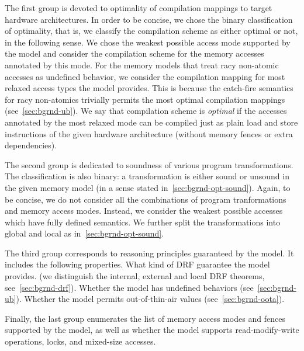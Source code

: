 The first group is devoted to optimality of compilation mappings
to target hardware architectures. In order to be concise, 
we chose the binary classification of optimality, 
that is, we classify the compilation scheme as either optimal or not,
in the following sense.
We chose the weakest possible access mode supported by the model
and consider the compilation scheme for the memory accesses annotated by this mode. 
For the memory models that treat racy non-atomic accesses
as undefined behavior, we consider the compilation mapping
for most relaxed access types the model provides.
This is because the catch-fire semantics for racy non-atomics 
trivially permits the most optimal compilation mappings (see~\cref{sec:bgrnd-ub}).
We say that compilation scheme is \emph{optimal} if the 
accesses annotated by the most relaxed mode 
can be compiled just as plain load and store instructions 
of the given hardware architecture (\ie without memory fences or extra dependencies). 

The second group is dedicated to soundness of various program transformations. 
The classification is also binary: a transformation is either sound or unsound 
in the given memory model (in a sense stated in~\cref{sec:bgrnd-opt-sound}).
Again, to be concise, we do not consider all the combinations 
of program tranformations and memory access modes. 
Instead, we consider the weakest possible accesses which have fully defined semantics. 
We further split the transformations into global and local as in~\cref{sec:bgrnd-opt-sound}.

The third group corresponds to reasoning principles guaranteed by the model. 
It includes the following properties. What kind of DRF guarantee the model provides.
(we distinguish the internal, external and local DRF theorems, see~\cref{sec:bgrnd-drf}).
Whether the model has undefined behaviors (see~\cref{sec:bgrnd-ub}).
Whether the model permits out-of-thin-air values (see~\cref{sec:bgrnd-oota}).

Finally, the last group enumerates the list of memory access modes 
and fences supported by the model, as well as whether the model 
supports read-modify-write operations, locks, and mixed-size accesses.